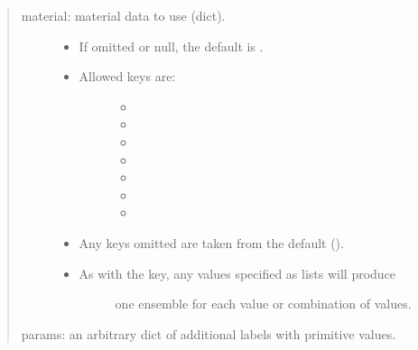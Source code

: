 \documentclass[letterpaper,10pt,english]{sphinxmanual}
\begin{document}
\begin{quote}
\begin{itemize}
\end{itemize}
\begin{description}
\item[{material: material data to use (dict).}] \leavevmode\begin{itemize}
\item {} 
If omitted or null, the default is .

\item {} \begin{description}
\item[{Allowed keys are:}] \leavevmode\begin{itemize}
\item {} 

\item {} 

\item {} 

\item {} 

\item {} 

\item {} 

\item {} 

\end{itemize}

\end{description}

\item {} 
Any keys omitted are taken from the default ().

\item {} \begin{description}
\item[{As with the  key, any values specified as lists will produce}] \leavevmode
one ensemble for each value or combination of values.

\end{description}

\end{itemize}

\end{description}

params: an arbitrary dict of additional labels with primitive values.
\end{quote}
\end{document}
